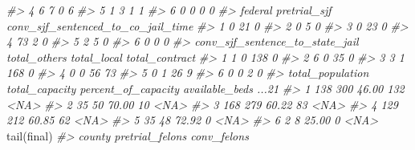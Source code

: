 \documentclass[
]{krantz}
\makeatletter
\newenvironment{Shaded}{\begin{snugshade}}{\end{snugshade}}
\newcommand{\CommentTok}[1]{\textcolor[rgb]{0.37,0.37,0.37}{\textit{#1}}}
\newcommand{\FunctionTok}[1]{\textcolor[rgb]{0,0,0}{#1}}
\newcommand{\NormalTok}[1]{#1}
\newenvironment{kframe}{%
\medskip{}
\setlength{\fboxsep}{.8em}
 \def\at@end@of@kframe{}%
 \ifinner\ifhmode%
  \def\at@end@of@kframe{\end{minipage}}%
  \begin{minipage}{\columnwidth}%
 \fi\fi%
 \def\FrameCommand##1{\hskip\@totalleftmargin \hskip-\fboxsep
 \colorbox{shadecolor}{##1}\hskip-\fboxsep
     \hskip-\linewidth \hskip-\@totalleftmargin \hskip\columnwidth}%
 \MakeFramed {\advance\hsize-\width
   \@totalleftmargin\z@ \linewidth\hsize
   \@setminipage}}%
 {\par\unskip\endMakeFramed%
 \at@end@of@kframe}
\renewenvironment{Shaded}{\begin{kframe}}{\end{kframe}}
\makeatother
\begin{document}
\begin{Shaded}
\begin{Highlighting}[]
\CommentTok{\#\textgreater{} 4                                  6             7         0              6}
\CommentTok{\#\textgreater{} 5                                  1             3         1              1}
\CommentTok{\#\textgreater{} 6                                  0             0         0              0}
\CommentTok{\#\textgreater{}   federal pretrial\_sjf conv\_sjf\_sentenced\_to\_co\_jail\_time}
\CommentTok{\#\textgreater{} 1       0           21                                  0}
\CommentTok{\#\textgreater{} 2       0            5                                  0}
\CommentTok{\#\textgreater{} 3       0           23                                  0}
\CommentTok{\#\textgreater{} 4      73            2                                  0}
\CommentTok{\#\textgreater{} 5       2            5                                  0}
\CommentTok{\#\textgreater{} 6       0            0                                  0}
\CommentTok{\#\textgreater{}   conv\_sjf\_sentence\_to\_state\_jail total\_others total\_local total\_contract}
\CommentTok{\#\textgreater{} 1                               1            0         138              0}
\CommentTok{\#\textgreater{} 2                               6            0          35              0}
\CommentTok{\#\textgreater{} 3                               3            1         168              0}
\CommentTok{\#\textgreater{} 4                               0            0          56             73}
\CommentTok{\#\textgreater{} 5                               0            1          26              9}
\CommentTok{\#\textgreater{} 6                               0            0           2              0}
\CommentTok{\#\textgreater{}   total\_population total\_capacity percent\_of\_capacity available\_beds ...21}
\CommentTok{\#\textgreater{} 1              138            300               46.00            132  \textless{}NA\textgreater{}}
\CommentTok{\#\textgreater{} 2               35             50               70.00             10  \textless{}NA\textgreater{}}
\CommentTok{\#\textgreater{} 3              168            279               60.22             83  \textless{}NA\textgreater{}}
\CommentTok{\#\textgreater{} 4              129            212               60.85             62  \textless{}NA\textgreater{}}
\CommentTok{\#\textgreater{} 5               35             48               72.92              0  \textless{}NA\textgreater{}}
\CommentTok{\#\textgreater{} 6                2              8               25.00              0  \textless{}NA\textgreater{}}
\FunctionTok{tail}\NormalTok{(final)}
\CommentTok{\#\textgreater{}         county pretrial\_felons conv\_felons}

\end{Highlighting}
\end{Shaded}
\end{document}
